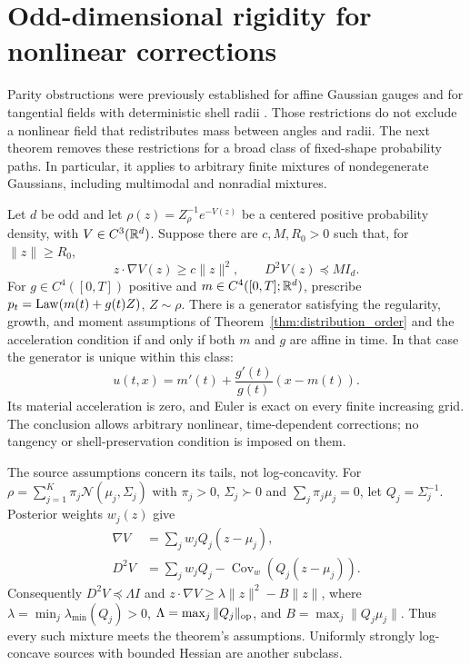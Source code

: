 \section{Odd-dimensional rigidity for nonlinear corrections}
\label{sec:nonlinear-parity}

Parity obstructions were previously established for affine Gaussian gauges
and for tangential fields with deterministic shell radii
\citep{obzherin2026density,obzherin2026finite}.  Those restrictions do not
exclude a nonlinear field that redistributes mass between angles and
radii.  The next theorem removes these restrictions for a broad class of
fixed-shape probability paths.  In particular, it applies to arbitrary
finite mixtures of nondegenerate Gaussians, including multimodal and
nonradial mixtures.

\begin{theorem}
\label{thm:nonlinear-odd-rigidity}
Let $d$ be odd and let $\rho(z)=Z_\rho^{-1}e^{-V(z)}$ be a centered
positive probability density, with $V\in C^3(\mathbb R^d)$.  Suppose there are
$c,M,R_0>0$ such that, for $\|z\|\ge R_0$,
\begin{equation}
 z\cdot\nabla V(z)\ge c\|z\|^2,
 \qquad D^2V(z)\preceq MI_d.
 \label{eq:parity-tail-assumptions}
\end{equation}
For $g\in C^4([0,T])$ positive and $m\in C^4([0,T];\mathbb R^d)$, prescribe
$p_t=\operatorname{Law}(m(t)+g(t)Z)$, $Z\sim\rho$.
There is a generator satisfying the regularity, growth, and moment
assumptions of Theorem~\ref{thm:distribution_order} and the acceleration
condition if and only if both $m$ and $g$ are affine in time.
In that case the generator is unique within this class:
\begin{equation}
 u(t,x)=m'(t)+\frac{g'(t)}{g(t)}(x-m(t)).
 \label{eq:odd-unique-generator}
\end{equation}
Its material acceleration is zero, and Euler is exact on every finite
increasing grid.  The conclusion allows arbitrary nonlinear,
time-dependent corrections; no tangency or shell-preservation condition
is imposed on them.
\end{theorem}

The source assumptions concern its tails, not log-concavity.  For
$\rho=\sum_{j=1}^K\pi_j\mathcal N(\mu_j,\Sigma_j)$ with
$\pi_j>0$, $\Sigma_j\succ0$ and $\sum_j\pi_j\mu_j=0$, let
$Q_j=\Sigma_j^{-1}$.  Posterior weights $w_j(z)$ give
\begin{align*}
 \nabla V&=\sum_jw_jQ_j(z-\mu_j),\\
 D^2V&=\sum_jw_jQ_j-\operatorname{Cov}_{w}(Q_j(z-\mu_j)).
\end{align*}
Consequently $D^2V\preceq\Lambda I$ and
$z\cdot\nabla V\ge\lambda\|z\|^2-B\|z\|$, where
$\lambda=\min_j\lambda_{\min}(Q_j)>0$,
$\Lambda=\max_j\|Q_j\|_{\rm op}$, and $B=\max_j\|Q_j\mu_j\|$.
Thus every such mixture meets the theorem's assumptions.  Uniformly
strongly log-concave sources with bounded Hessian are another subclass.

